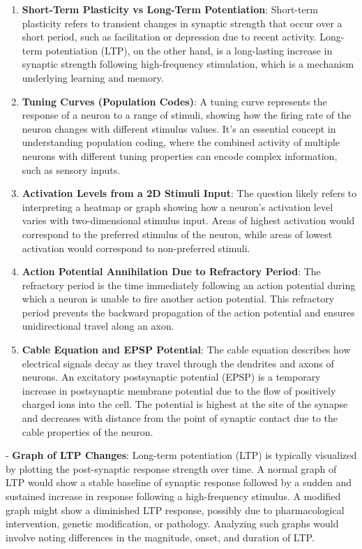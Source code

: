 \documentclass{article}
\begin{document}
\begin{enumerate}
    \item \textbf{Short-Term Plasticity vs Long-Term Potentiation}: Short-term plasticity refers to transient changes in synaptic strength that occur over a short period, such as facilitation or depression due to recent activity. Long-term potentiation (LTP), on the other hand, is a long-lasting increase in synaptic strength following high-frequency stimulation, which is a mechanism underlying learning and memory.

    \item \textbf{Tuning Curves (Population Codes)}: A tuning curve represents the response of a neuron to a range of stimuli, showing how the firing rate of the neuron changes with different stimulus values. It's an essential concept in understanding population coding, where the combined activity of multiple neurons with different tuning properties can encode complex information, such as sensory inputs.

    \item \textbf{Activation Levels from a 2D Stimuli Input}: The question likely refers to interpreting a heatmap or graph showing how a neuron's activation level varies with two-dimensional stimulus input. Areas of highest activation would correspond to the preferred stimulus of the neuron, while areas of lowest activation would correspond to non-preferred stimuli.

    \item \textbf{Action Potential Annihilation Due to Refractory Period}: The refractory period is the time immediately following an action potential during which a neuron is unable to fire another action potential. This refractory period prevents the backward propagation of the action potential and ensures unidirectional travel along an axon.

    \item \textbf{Cable Equation and EPSP Potential}: The cable equation describes how electrical signals decay as they travel through the dendrites and axons of neurons. An excitatory postsynaptic potential (EPSP) is a temporary increase in postsynaptic membrane potential due to the flow of positively charged ions into the cell. The potential is highest at the site of the synapse and decreases with distance from the point of synaptic contact due to the cable properties of the neuron.
\end{enumerate}

- \textbf{Graph of LTP Changes}: Long-term potentiation (LTP) is typically visualized by plotting the post-synaptic response strength over time. A normal graph of LTP would show a stable baseline of synaptic response followed by a sudden and sustained increase in response following a high-frequency stimulus. A modified graph might show a diminished LTP response, possibly due to pharmacological intervention, genetic modification, or pathology. Analyzing such graphs would involve noting differences in the magnitude, onset, and duration of LTP.
\end{document}
